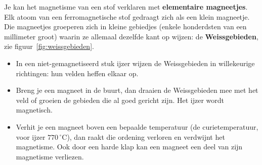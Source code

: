 \documentclass{ximera}
\begin{document}
\begin{remark}[expandable=true,title={Extra: elementaire magneetjes en Weissgebieden}]\nl
    Je kan het magnetisme van een stof verklaren met \textbf{elementaire magneetjes}. Elk atoom van een ferromagnetische stof gedraagt zich als een klein magneetje. Die magneetjes groeperen zich in kleine gebiedjes (enkele honderdsten van een millimeter groot) waarin ze allemaal dezelfde kant op wijzen: de \textbf{Weissgebieden}, zie figuur~\ref{fig:weissgebieden}.
    \begin{itemize}
        \item In een niet-gemagnetiseerd stuk ijzer wijzen de Weissgebieden in willekeurige richtingen: hun velden heffen elkaar op.
        \item Breng je een magneet in de buurt, dan draaien de Weissgebieden mee met het veld of groeien de gebieden die al goed gericht zijn. Het ijzer wordt magnetisch.
        \item Verhit je een magneet boven een bepaalde temperatuur (de curietemperatuur, voor ijzer $770\,^\circ\mathrm{C}$), dan raakt die ordening verloren en verdwijnt het magnetisme. Ook door een harde klap kan een magneet een deel van zijn magnetisme verliezen.
    \end{itemize}

    \begin{center}
        \captionsetup{width=0.85\textwidth}
        \label{fig:weissgebieden}
    \end{center}
\end{remark}
\end{document}
